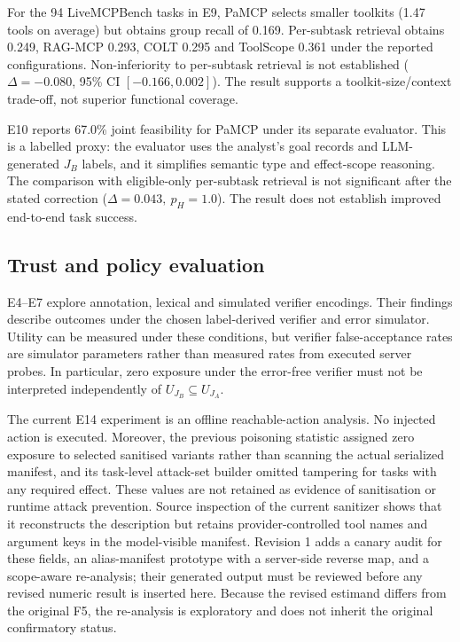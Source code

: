 For the 94 LiveMCPBench tasks in E9, PaMCP selects smaller toolkits (1.47 tools on average) but obtains group
recall of 0.169. Per-subtask retrieval obtains 0.249, RAG-MCP 0.293, COLT 0.295 and ToolScope 0.361 under the
reported configurations. Non-inferiority to per-subtask retrieval is not established (\(\Delta=-0.080\),
95\% CI \([-0.166,0.002]\)). The result supports a toolkit-size/context trade-off, not superior functional coverage.

E10 reports 67.0\% joint feasibility for PaMCP under its separate evaluator. This is a labelled proxy: the evaluator
uses the analyst's goal records and LLM-generated \(J_B\) labels, and it simplifies semantic type and effect-scope
reasoning. The comparison with eligible-only per-subtask retrieval is not significant after the stated correction
(\(\Delta=0.043,\ p_H=1.0\)). The result does not establish improved end-to-end task success.

\subsection{Trust and policy evaluation}

E4--E7 explore annotation, lexical and simulated verifier encodings. Their findings describe outcomes under the
chosen label-derived verifier and error simulator. Utility can be measured under these conditions, but verifier
false-acceptance rates are simulator parameters rather than measured rates from executed server probes. In
particular, zero exposure under the error-free verifier must not be interpreted independently of
\(U_{J_B}\subseteq U_{J_A}\).

The current E14 experiment is an offline reachable-action analysis. No injected action is executed. Moreover,
the previous poisoning statistic assigned zero exposure to selected sanitised variants rather than scanning the
actual serialized manifest, and its task-level attack-set builder omitted tampering for tasks with any required
effect. These values are not retained as evidence of sanitisation or runtime attack prevention. Source inspection
of the current sanitizer shows that it reconstructs the description but retains provider-controlled tool names
and argument keys in the model-visible manifest. Revision 1 adds a canary audit for these fields, an alias-manifest
prototype with a server-side reverse map, and a scope-aware re-analysis; their generated output must be reviewed
before any revised numeric result is inserted here. Because the revised estimand differs from the original F5,
the re-analysis is exploratory and does not inherit the original confirmatory status.

